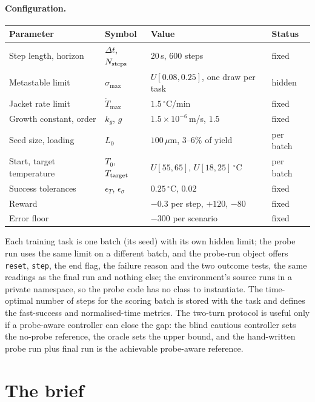 \documentclass[11pt,a4paper]{article}
\begin{document}
\paragraph{Configuration.}
\begin{center}
\small
\begin{tabular}{@{}llll@{}}
\toprule
Parameter & Symbol & Value & Status \\
\midrule
Step length, horizon & $\Delta t$, $N_{\rm steps}$ & 20\,s, 600 steps & fixed \\
Metastable limit & $\sigma_{\max}$ & $U[0.08,0.25]$, one draw per task & hidden \\
Jacket rate limit & $\dot T_{\max}$ & $1.5\,^\circ$C/min & fixed \\
Growth constant, order & $k_g$, $g$ & $1.5\times10^{-6}$\,m/s, $1.5$ & fixed \\
Seed size, loading & $L_0$ & $100\,\mu$m, $3$--$6\%$ of yield & per batch \\
Start, target temperature & $T_0$, $T_{\rm target}$ & $U[55,65]$, $U[18,25]\,^\circ$C & per batch \\
Success tolerances & $\epsilon_T$, $\epsilon_\sigma$ & $0.25\,^\circ$C, $0.02$ & fixed \\
Reward & & $-0.3$ per step, $+120$, $-80$ & fixed \\
Error floor & & $-300$ per scenario & fixed \\
\bottomrule
\end{tabular}
\end{center}

Each training task is one batch (its seed) with its own hidden limit; the probe run uses the same limit on a different batch, and the probe-run object offers \texttt{reset}, \texttt{step}, the end flag, the failure reason and the two outcome tests, the same readings as the final run and nothing else; the environment's source runs in a private namespace, so the probe code has no class to instantiate. The time-optimal number of steps for the scoring batch is stored with the task and defines the fast-success and normalised-time metrics. The two-turn protocol is useful only if a probe-aware controller can close the gap: the blind cautious controller sets the no-probe reference, the oracle sets the upper bound, and the hand-written probe run plus final run is the achievable probe-aware reference.

\section{The brief}
\label{app:brief}
\end{document}
